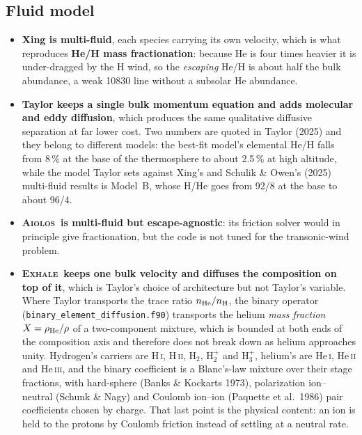 \documentclass[english,a4paper]{my_memo}
\newcommand{\EXHALE}{\textsc{Exhale}}
\newcommand{\AIOLOS}{\textsc{Aiolos}}
\begin{document}
\subsection{Fluid model}
\label{sec:fluid}
\begin{itemize}[nosep]
  \item \textbf{Xing is multi-fluid}, each species carrying its own velocity,
    which is what reproduces \textbf{He/H mass fractionation}: because He is
    four times heavier it is under-dragged by the H wind, so the
    \emph{escaping} He/H is about half the bulk abundance, a weak 10830 line
    without a subsolar He abundance.
  \item \textbf{Taylor keeps a single bulk momentum equation and adds molecular
    and eddy diffusion}, which produces the same qualitative diffusive
    separation at far lower cost. Two numbers are quoted in Taylor (2025) and
    they belong to different models: the best-fit model's elemental He/H falls
    from 8\,\% at the base of the thermosphere to about 2.5\,\% at high
    altitude, while the model Taylor sets against Xing's and Schulik \& Owen's
    (2025) multi-fluid results is Model~B, whose H/He goes from 92/8 at the
    base to about 96/4.
  \item \textbf{\AIOLOS\ is multi-fluid but escape-agnostic}: its friction
    solver would in principle give fractionation, but the code is not tuned for
    the transonic-wind problem.
  \item \textbf{\EXHALE\ keeps one bulk velocity and diffuses the composition
    on top of it}, which is Taylor's choice of architecture but not Taylor's
    variable. Where Taylor transports the trace ratio $n_{\rm He}/n_{\rm H}$,
    the binary operator
    (\texttt{binary\_element\_diffusion.f90}) transports the helium
    \emph{mass fraction} $X = \rho_{\rm He}/\rho$ of a two-component mixture,
    which is bounded at both ends of the composition axis and therefore does
    not break down as helium approaches unity. Hydrogen's carriers are
    H\,\textsc{i}, H\,\textsc{ii}, H$_2$, H$_2^+$ and H$_3^+$, helium's are
    He\,\textsc{i}, He\,\textsc{ii} and He\,\textsc{iii}, and the binary
    coefficient is a Blanc's-law mixture over their stage fractions, with
    hard-sphere (Banks \& Kockarts 1973), polarization ion--neutral (Schunk \&
    Nagy) and Coulomb ion--ion (Paquette et al.\ 1986) pair coefficients chosen
    by charge. That last point is the physical content: an ion is held to the
    protons by Coulomb friction instead of settling at a neutral rate.
\end{itemize}
\end{document}

